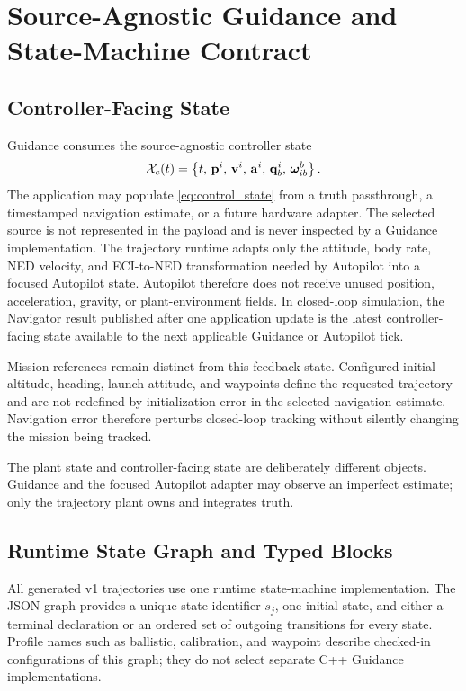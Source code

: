 \chapter{Source-Agnostic Guidance and State-Machine Contract}

\section{Controller-Facing State}

Guidance consumes the source-agnostic controller state
\begin{equation}
\mathcal{X}_{c}(t)=
\left\{
t,\,
\mathbf{p}^{i},\,
\mathbf{v}^{i},\,
\mathbf{a}^{i},\,
\mathbf{q}_b^i,\,
\boldsymbol{\omega}_{ib}^{b}
\right\}.
\label{eq:control_state}
\end{equation}
The application may populate \cref{eq:control_state} from a truth passthrough,
a timestamped navigation estimate, or a future hardware adapter. The selected
source is not represented in the payload and is never inspected by a Guidance
implementation. The trajectory runtime adapts only the attitude, body rate,
NED velocity, and ECI-to-NED transformation needed by Autopilot into a focused
Autopilot state. Autopilot therefore does not receive unused position,
acceleration, gravity, or plant-environment fields. In closed-loop simulation,
the Navigator result published after one application update is the latest
controller-facing state available to the next applicable Guidance or
Autopilot tick.

Mission references remain distinct from this feedback state. Configured
initial altitude, heading, launch attitude, and waypoints define the requested
trajectory and are not redefined by initialization error in the selected
navigation estimate. Navigation error therefore perturbs closed-loop tracking
without silently changing the mission being tracked.

\begin{implbox}
The plant state and controller-facing state are deliberately different
objects. Guidance and the focused Autopilot adapter may observe an imperfect
estimate; only the trajectory plant owns and integrates truth.
\end{implbox}

\section{Runtime State Graph and Typed Blocks}

All generated v1 trajectories use one runtime state-machine implementation.
The JSON graph provides a unique state identifier $s_j$, one initial state,
and either a terminal declaration or an ordered set of outgoing transitions
for every state. Profile names such as ballistic, calibration, and waypoint
describe checked-in configurations of this graph; they do not select separate
C++ Guidance implementations.

